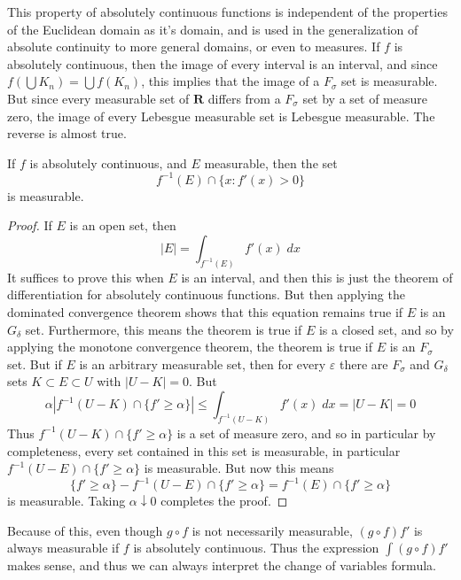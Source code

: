 This property of absolutely continuous functions is independent of the properties of the Euclidean domain as it's domain, and is used in the generalization of absolute continuity to more general domains, or even to measures. If $f$ is absolutely continuous, then the image of every interval is an interval, and since $f(\bigcup K_n) = \bigcup f(K_n)$, this implies that the image of a $F_\sigma$ set is measurable. But since every measurable set of $\mathbf{R}$ differs from a $F_\sigma$ set by a set of measure zero, the image of every Lebesgue measurable set is Lebesgue measurable. The reverse is almost true.

\begin{lemma}
  If $f$ is absolutely continuous, and $E$ measurable, then the set
  \[ f^{-1}(E) \cap \{ x : f'(x) > 0 \} \]
  is measurable.
\end{lemma}
\begin{proof}
  If $E$ is an open set, then
  \[ |E| = \int_{f^{-1}(E)} f'(x)\; dx \]
  It suffices to prove this when $E$ is an interval, and then this is just the theorem of differentiation for absolutely continuous functions. But then applying the dominated convergence theorem shows that this equation remains true if $E$ is an $G_\delta$ set. Furthermore, this means the theorem is true if $E$ is a closed set, and so by applying the monotone convergence theorem, the theorem is true if $E$ is an $F_\sigma$ set. But if $E$ is an arbitrary measurable set, then for every $\varepsilon$ there are $F_\sigma$ and $G_\delta$ sets $K \subset E \subset U$ with $|U - K| = 0$. But
  \[ \alpha|f^{-1}(U - K) \cap \{ f' \geq \alpha \}| \leq \int_{f^{-1}(U-K)} f'(x)\; dx = |U - K| = 0 \]
  Thus $f^{-1}(U-K) \cap \{ f' \geq \alpha \}$ is a set of measure zero, and so in particular by completeness, every set contained in this set is measurable, in particular $f^{-1}(U - E) \cap \{ f' \geq \alpha \}$ is measurable. But now this means
  \[ \{ f' \geq \alpha \} - f^{-1}(U-E) \cap \{ f' \geq \alpha \} = f^{-1}(E) \cap \{ f' \geq \alpha \} \]
  is measurable. Taking $\alpha \downarrow 0$ completes the proof.
\end{proof}

Because of this, even though $g \circ f$ is not necessarily measurable, $(g \circ f) f'$ is always measurable if $f$ is absolutely continuous. Thus the expression $\int (g \circ f) f'$ makes sense, and thus we can always interpret the change of variables formula.

